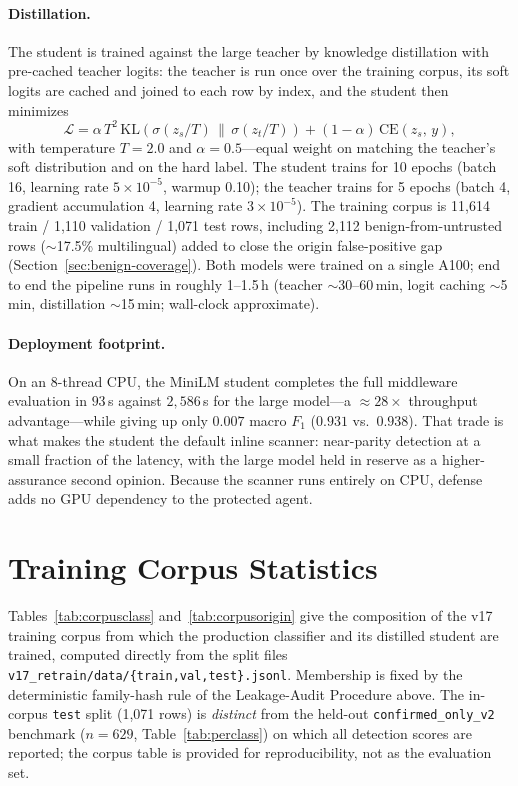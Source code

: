 \documentclass{article}
\begin{document}
\paragraph{Distillation.} The student is trained against the large teacher by knowledge distillation with pre-cached teacher logits: the teacher is run once over the training corpus, its soft logits are cached and joined to each row by index, and the student then minimizes
\[
\mathcal{L} = \alpha\,T^{2}\,\mathrm{KL}\!\left(\sigma(z_s/T)\,\|\,\sigma(z_t/T)\right) + (1-\alpha)\,\mathrm{CE}(z_s,\,y),
\]
with temperature $T=2.0$ and $\alpha=0.5$---equal weight on matching the teacher's soft distribution and on the hard label. The student trains for 10 epochs (batch 16, learning rate $5\times10^{-5}$, warmup 0.10); the teacher trains for 5 epochs (batch 4, gradient accumulation 4, learning rate $3\times10^{-5}$). The training corpus is 11{,}614 train / 1{,}110 validation / 1{,}071 test rows, including 2{,}112 benign-from-untrusted rows ($\sim$17.5\% multilingual) added to close the origin false-positive gap (Section~\ref{sec:benign-coverage}). Both models were trained on a single A100; end to end the pipeline runs in roughly 1--1.5\,h (teacher $\sim$30--60\,min, logit caching $\sim$5\,min, distillation $\sim$15\,min; wall-clock approximate).

\paragraph{Deployment footprint.} On an 8-thread CPU, the MiniLM student completes the full middleware evaluation in $93$\,s against $2{,}586$\,s for the large model---a $\approx$$28\times$ throughput advantage---while giving up only $0.007$ macro $F_1$ ($0.931$ vs.\ $0.938$). That trade is what makes the student the default inline scanner: near-parity detection at a small fraction of the latency, with the large model held in reserve as a higher-assurance second opinion. Because the scanner runs entirely on CPU, defense adds no GPU dependency to the protected agent.

\section{Training Corpus Statistics}

Tables~\ref{tab:corpusclass} and~\ref{tab:corpusorigin} give the composition of the v17 training corpus from which the production classifier and its distilled student are trained, computed directly from the split files \texttt{v17\_retrain/data/\{train,val,test\}.jsonl}. Membership is fixed by the deterministic family-hash rule of the Leakage-Audit Procedure above. The in-corpus \texttt{test} split (1{,}071 rows) is \emph{distinct} from the held-out \texttt{confirmed\_only\_v2} benchmark ($n=629$, Table~\ref{tab:perclass}) on which all detection scores are reported; the corpus table is provided for reproducibility, not as the evaluation set.
\end{document}
